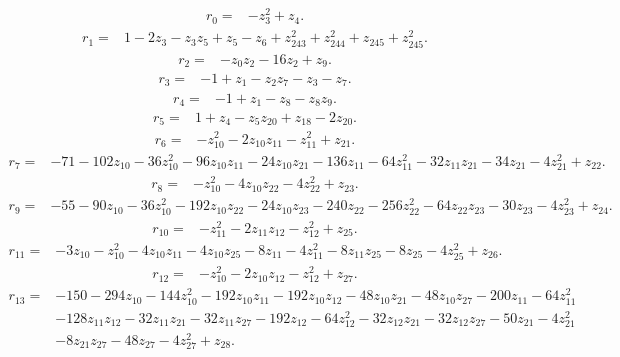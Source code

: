 \begin{align*}
 r_{0}={}&-z_{3}^{2}+z_{4} .
\end{align*}
\begin{align*}
 r_{1}={}&1-2z_{3}-z_{3}z_{5}+z_{5}-z_{6}+z_{243}^{2}+z_{244}^{2}+z_{245}+z_{245}^{2} .
\end{align*}
\begin{align*}
 r_{2}={}&-z_{0}z_{2}-16z_{2}+z_{9} .
\end{align*}
\begin{align*}
 r_{3}={}&-1+z_{1}-z_{2}z_{7}-z_{3}-z_{7} .
\end{align*}
\begin{align*}
 r_{4}={}&-1+z_{1}-z_{8}-z_{8}z_{9} .
\end{align*}
\begin{align*}
 r_{5}={}&1+z_{4}-z_{5}z_{20}+z_{18}-2z_{20} .
\end{align*}
\begin{align*}
 r_{6}={}&-z_{10}^{2}-2z_{10}z_{11}-z_{11}^{2}+z_{21} .
\end{align*}
\begin{align*}
 r_{7}={}&-71-102z_{10}-36z_{10}^{2}-96z_{10}z_{11}-24z_{10}z_{21}-136z_{11}-64z_{11}^{2}-32z_{11}z_{21}-34z_{21}-4z_{21}^{2}+z_{22} .
\end{align*}
\begin{align*}
 r_{8}={}&-z_{10}^{2}-4z_{10}z_{22}-4z_{22}^{2}+z_{23} .
\end{align*}
\begin{align*}
 r_{9}={}&-55-90z_{10}-36z_{10}^{2}-192z_{10}z_{22}-24z_{10}z_{23}-240z_{22}-256z_{22}^{2}-64z_{22}z_{23}-30z_{23}-4z_{23}^{2}+z_{24} .
\end{align*}
\begin{align*}
 r_{10}={}&-z_{11}^{2}-2z_{11}z_{12}-z_{12}^{2}+z_{25} .
\end{align*}
\begin{align*}
 r_{11}={}&-3z_{10}-z_{10}^{2}-4z_{10}z_{11}-4z_{10}z_{25}-8z_{11}-4z_{11}^{2}-8z_{11}z_{25}-8z_{25}-4z_{25}^{2}+z_{26} .
\end{align*}
\begin{align*}
 r_{12}={}&-z_{10}^{2}-2z_{10}z_{12}-z_{12}^{2}+z_{27} .
\end{align*}
\begin{align*}
 r_{13}={}&-150-294z_{10}-144z_{10}^{2}-192z_{10}z_{11}-192z_{10}z_{12}-48z_{10}z_{21}-48z_{10}z_{27}-200z_{11}-64z_{11}^{2}\\
 &-128z_{11}z_{12}-32z_{11}z_{21}-32z_{11}z_{27}-192z_{12}-64z_{12}^{2}-32z_{12}z_{21}-32z_{12}z_{27}-50z_{21}-4z_{21}^{2}\\
 &-8z_{21}z_{27}-48z_{27}-4z_{27}^{2}+z_{28} .
\end{align*}

